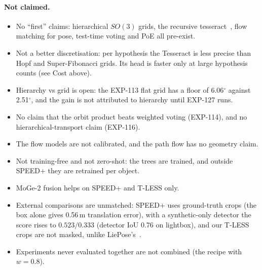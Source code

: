 \paragraph{Not claimed.}
\begin{itemize}
  \item No ``first'' claims: hierarchical $SO(3)$ grids, the recursive tesseract~\cite{kurz2017tesseract}, flow matching for pose, test-time voting and PoE all pre-exist.
  \item Not a better discretisation: per hypothesis the Tesseract is less precise than Hopf and Super-Fibonacci grids. Its head is faster only at large hypothesis counts (see Cost above).
  \item Hierarchy vs grid is open: the EXP-113 flat grid has a floor of 6.06$^\circ$ against 2.51$^\circ$, and the gain is not attributed to hierarchy until EXP-127 runs.
  \item No claim that the orbit product beats weighted voting (EXP-114), and no hierarchical-transport claim (EXP-116).
  \item The flow models are not calibrated, and the path flow has no geometry claim.
  \item Not training-free and not zero-shot: the trees are trained, and outside SPEED+ they are retrained per object.
  \item MoGe-2 fusion helps on SPEED+ and T-LESS only.
  \item External comparisons are unmatched: SPEED+ uses ground-truth crops (the box alone gives 0.56\,m translation error), with a synthetic-only detector the score rises to $0.523/0.333$ (detector IoU 0.76 on lightbox), and our T-LESS crops are not masked, unlike LiePose's~\cite{hsiao2024liepose}.
  \item Experiments never evaluated together are not combined (\eg the recipe with $w=0.8$).
\end{itemize}

